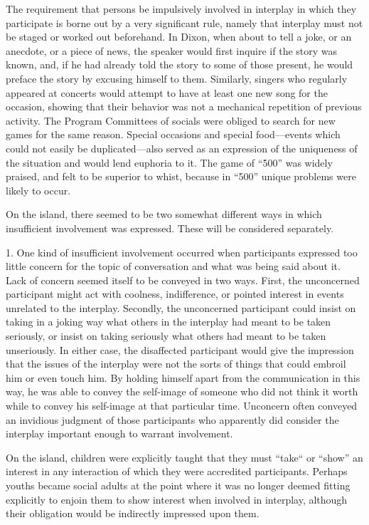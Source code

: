 \documentclass[openany,nobib]{tufte-book}
\begin{document}
The requirement that persons be impulsively involved in interplay in
which they participate is borne out by a very significant rule, namely
that interplay must not be staged or worked out beforehand. In Dixon,
when about to tell a joke, or an anecdote, or a piece of news, the
speaker would first inquire if the story was known, and, if he had
already told the story to some of those present, he would preface the
story by excusing himself to them. Similarly, singers who regularly
appeared at concerts would attempt to have at least one new song for the
occasion, showing that their behavior was not a mechanical repetition of
previous activity. The Program Committees of socials were obliged to
search for new games for the same reason. Special occasions and special
food---events which could not easily be duplicated---also served as an
expression of the uniqueness of the situation and would lend euphoria to
it. The game of ``500'' was widely praised, and felt to be superior to
whist, because in ``500'' unique problems were likely to occur.

On the island, there seemed to be two somewhat different ways in which
insufficient involvement was expressed. These will be considered
separately.

1. One kind of insufficient involvement occurred when participants
expressed too little concern for the topic of conversation and what was
being said about it. Lack of concern seemed itself to be conveyed in two
ways. First, the unconcerned participant might act with coolness,
indifference, or pointed interest in events unrelated to the interplay.
Secondly, the unconcerned participant could insist on taking in a joking
way what others in the interplay had meant to be taken seriously, or
insist on taking seriously what others had meant to be taken
unseriously. In either case, the disaffected participant would give the
impression that the issues of the interplay were not the sorts of things
that could embroil him or even touch him. By holding himself apart from
the communication in this way, he was able to convey the self-image of
someone who did not think it worth while to convey his self-image at
that particular time. Unconcern often conveyed an invidious judgment of
those participants who apparently did consider the interplay important
enough to warrant involvement.

On the island, children were explicitly taught that they must ``take``
or ``show'' an interest in any interaction of which they were accredited
participants. Perhaps youths became social adults at the point where it
was no longer deemed fitting explicitly to enjoin them to show interest
when involved in interplay, although their obligation would be
indirectly impressed upon them.
\end{document}
